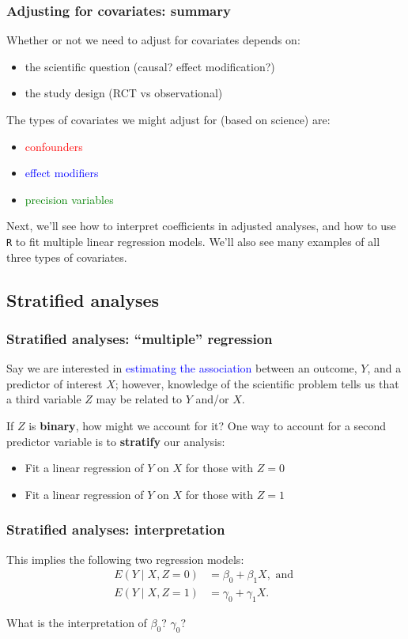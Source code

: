 \documentclass[12pt, 
hyperref={colorlinks=true, linkcolor=blue, urlcolor=cyan},dvipsnames]{beamer}
\begin{document}
\begin{frame}
\frametitle{Adjusting for covariates: summary}
Whether or not we need to adjust for covariates depends on: \vspace{-0.2cm}
\begin{itemize}
\item the scientific question (causal? effect modification?)
\item the study design (RCT vs observational)
\end{itemize}

The types of covariates we might adjust for (based on science) are: \vspace{-0.2cm}
\begin{itemize}
\item \textcolor{red}{confounders}
\item \textcolor{blue}{effect modifiers}
\item \textcolor{green}{precision variables}
\end{itemize}

Next, we'll see how to interpret coefficients in adjusted analyses, and how to use \texttt{R} to fit multiple linear regression models. We'll also see many examples of all three types of covariates.
\end{frame}


\subsection{Stratified analyses}
\begin{frame}
\frametitle{Stratified analyses: ``multiple'' regression}
Say we are interested in \textcolor{blue}{estimating the association} between an outcome, $Y$, and a predictor of interest $X$; however, knowledge of the scientific problem tells us that a third variable $Z$ may be related to $Y$ and/or $X$.

If $Z$ is \textbf{binary}, how might we account for it? \pause
One way to account for a second predictor variable is to \textbf{stratify} our analysis:
\begin{itemize}
\item Fit a linear regression of $Y$ on $X$ for those with $Z = 0$
\item Fit a linear regression of $Y$ on $X$ for those with $Z = 1$
\end{itemize}

\end{frame}

\begin{frame}
\frametitle{Stratified analyses: interpretation}
\vspace{-2cm}This implies the following two regression models:
\begin{align*}
E(Y \mid X, Z = 0) &= \beta_0 + \beta_1 X, \text{ and } \\
E(Y \mid X, Z = 1) &= \gamma_0 + \gamma_1 X.
\end{align*}

What is the interpretation of $\beta_0$? $\gamma_0$?
\end{frame}
\end{document}
